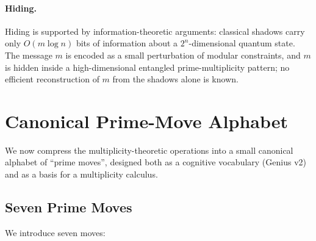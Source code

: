 \documentclass[11pt]{article}
\begin{document}
\paragraph{Hiding.} Hiding is supported by information-theoretic arguments: classical shadows carry only $O(m \log n)$ bits of information about a $2^n$-dimensional quantum state. The message $m$ is encoded as a small perturbation of modular constraints, and $m$ is hidden inside a high-dimensional entangled prime-multiplicity pattern; no efficient reconstruction of $m$ from the shadows alone is known.

\section{Canonical Prime-Move Alphabet}

We now compress the multiplicity-theoretic operations into a small canonical alphabet of ``prime moves'', designed both as a cognitive vocabulary (Genius v2) and as a basis for a multiplicity calculus.

\subsection{Seven Prime Moves}

We introduce seven moves:
\end{document}
